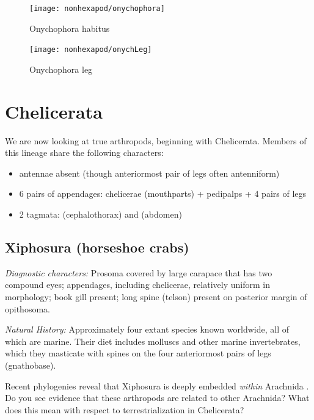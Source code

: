 \begin{figure}[ht!]
  \centering
    \texttt{[image: nonhexapod/onychophora]}
  \caption{Onychophora habitus \citep[][Fig. 81]{bhlitem40112britmus}}
  \label{fig:onych}
\end{figure}

\begin{figure}[ht!]
  \centering
    \texttt{[image: nonhexapod/onychLeg]}
  \caption{Onychophora leg \citep[][Fig. 6]{bhlpart201070OnychLeg}}
  \label{fig:onychLeg}
\end{figure}

\section{Chelicerata}
We are now looking at true arthropods, beginning with Chelicerata. Members of this lineage share the following characters: 
\begin{itemize}
\item antennae absent (though anteriormost pair of legs often antenniform)
\item 6 pairs of  appendages: chelicerae (mouthparts) + pedipalps + 4 pairs of legs
\item 2 tagmata:  (cephalothorax) and  (abdomen)
\end{itemize}

\subsection{Xiphosura (horseshoe crabs)}
\noindent{}\textit{Diagnostic characters:} Prosoma covered by large carapace that has two compound eyes; appendages, including chelicerae, relatively uniform in morphology; book gill present; long spine (telson) present on posterior margin of opithosoma.\vspace{3mm}

\noindent{}\textit{Natural History:} Approximately four extant species known worldwide, all of which are marine. Their diet includes molluscs and other marine invertebrates, which they masticate with spines on the four anteriormost pairs of legs (gnathobase).\vspace{5mm}

\begin{theo}
{}Recent phylogenies reveal that Xiphosura is deeply embedded \textit{within} Arachnida \citep[\textit{e.g}.,][]{d13110568}. Do you see evidence that these arthropods are related to other Arachnida? What does this mean with respect to terrestrialization in Chelicerata?
\end{theo}

